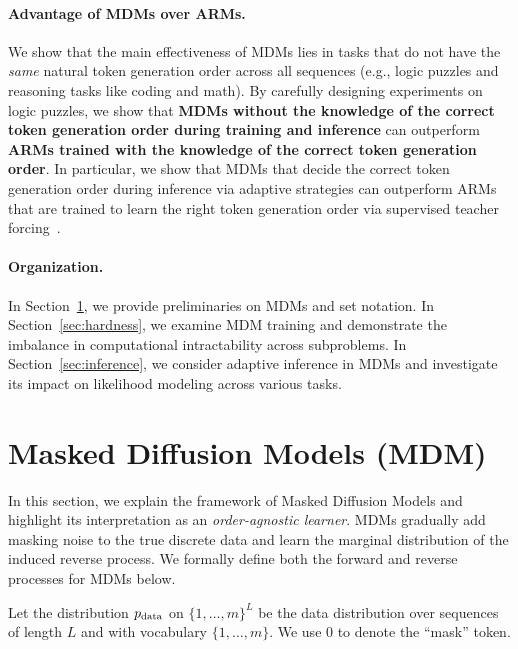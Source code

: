 \documentclass{article}
\newcommand{\mask}{0}
\theoremstyle{plain}
\theoremstyle{definition}
\theoremstyle{remark}
\begin{document}
\paragraph{Advantage of MDMs over ARMs.} We show that the main effectiveness of MDMs lies in tasks that do not have the \emph{same} natural token generation order across all sequences (e.g., logic puzzles and reasoning tasks like coding and math). By carefully designing experiments on logic puzzles, we show that \textbf{MDMs without the knowledge of the correct token generation order during training and inference} can outperform \textbf{ARMs trained with the knowledge of the correct token generation order}. In particular, we show that MDMs that decide the correct token generation order during inference via adaptive strategies can outperform ARMs that are trained to learn the right token generation order via supervised teacher forcing~\cite{shah2024causal,lehnert2024beyond}. 


\paragraph{Organization.} In Section~\ref{sec:2}, we provide preliminaries on MDMs and set notation. In Section~\ref{sec:hardness}, we 
examine MDM training and demonstrate the imbalance in computational intractability across subproblems. In Section~\ref{sec:inference}, we consider adaptive inference in MDMs and investigate its impact on likelihood modeling across various tasks.
 
\section{Masked Diffusion Models (MDM)} \label{sec:2}
In this section, we explain the framework of Masked Diffusion Models \cite{shi2025simplified,sahoo2024simple} and highlight its interpretation as an \emph{order-agnostic learner}. MDMs gradually add masking noise to the true discrete data and learn the marginal distribution of the induced reverse process. We formally define both the forward and reverse processes for MDMs below.


Let the distribution $p_{\rm{data}}$ on $\{1,\ldots,m\}^L$ be the data distribution over sequences of length $L$ and with vocabulary $\{1, \ldots, m\}$. We use $\mask$ to denote the ``mask'' token. 
\end{document}
